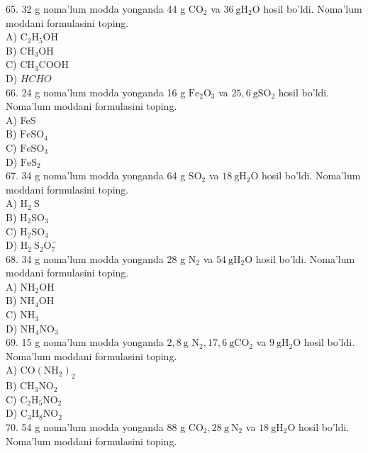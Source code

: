 65. 32 g noma'lum modda yonganda 44 g $\mathrm{CO}_{2}$ va $36 \mathrm{~g} \mathrm{H}_{2} \mathrm{O}$ hosil bo'ldi. Noma'lum moddani formulasini toping.\\
A) $\mathrm{C}_{2} \mathrm{H}_{5} \mathrm{OH}$\\
B) $\mathrm{CH}_{3} \mathrm{OH}$\\
C) $\mathrm{CH}_{3} \mathrm{COOH}$\\
D) $HCHO$\\
66. 24 g noma'lum modda yonganda 16 g $\mathrm{Fe}_{2} \mathrm{O}_{3}$ va $25,6 \mathrm{~g} \mathrm{SO}_{2}$ hosil bo'ldi. Noma'lum moddani formulasini toping.\\
A) FeS\\
B) $\mathrm{FeSO}_{4}$\\
C) $\mathrm{FeSO}_{3}$\\
D) $\mathrm{FeS}_{2}$\\
67. 34 g noma'lum modda yonganda 64 g $\mathrm{SO}_{2}$ va $18 \mathrm{~g} \mathrm{H}_{2} \mathrm{O}$ hosil bo'ldi. Noma'lum moddani formulasini toping.\\
A) $\mathrm{H}_{2} \mathrm{~S}$\\
B) $\mathrm{H}_{2} \mathrm{SO}_{3}$\\
C) $\mathrm{H}_{2} \mathrm{SO}_{4}$\\
D) $\mathrm{H}_{2} \mathrm{~S}_{2} \mathrm{O}_{7}^{-}$\\
68. 34 g noma'lum modda yonganda 28 g $\mathrm{N}_{2}$ va $54 \mathrm{~g} \mathrm{H}_{2} \mathrm{O}$ hosil bo'ldi. Noma'lum moddani formulasini toping.\\
A) $\mathrm{NH}_{2} \mathrm{OH}$\\
B) $\mathrm{NH}_{4} \mathrm{OH}$\\
C) $\mathrm{NH}_{3}$\\
D) $\mathrm{NH}_{4} \mathrm{NO}_{3}$\\
69. 15 g noma'lum modda yonganda $2,8 \mathrm{~g}$ $\mathrm{N}_{2}, 17,6 \mathrm{~g} \mathrm{CO}_{2}$ va $9 \mathrm{~g} \mathrm{H}_{2} \mathrm{O}$ hosil bo'ldi.\\
Noma'lum moddani formulasini toping.\\
A) $\mathrm{CO}\left(\mathrm{NH}_{2}\right)_{2}$\\
B) $\mathrm{CH}_{3} \mathrm{NO}_{2}$\\
C) $\mathrm{C}_{2} \mathrm{H}_{5} \mathrm{NO}_{2}$\\
D) $\mathrm{C}_{3} \mathrm{H}_{8} \mathrm{NO}_{2}$\\
70. 54 g noma'lum modda yonganda 88 g $\mathrm{CO}_{2}, 28 \mathrm{~g} \mathrm{~N}_{2}$ va $18 \mathrm{~g} \mathrm{H}_{2} \mathrm{O}$ hosil bo'ldi. Noma'lum moddani formulasini toping.\\
